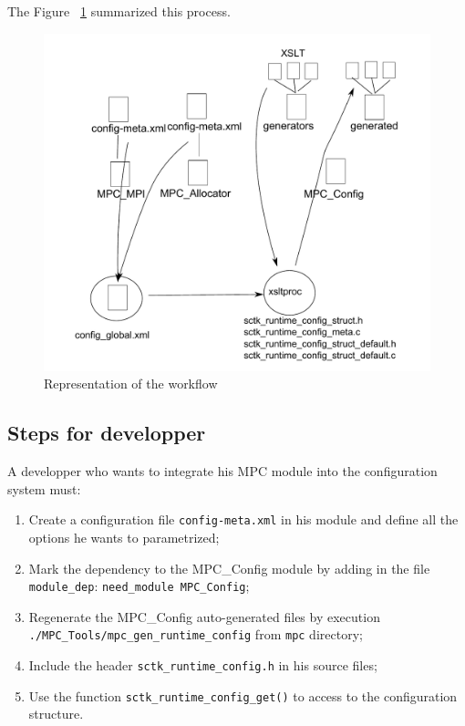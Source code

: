 \documentclass{article}
\begin{document}
\noindent The Figure ~\ref{fig:conf_workflow_conf} summarized this process.

\begin{figure}[htc!]
\includegraphics[scale=0.8]{file-workflow.pdf}
\caption{Representation of the workflow}
\label{fig:conf_workflow_conf}
\end{figure}

\subsection {Steps for developper}

A developper who wants to integrate his MPC module into the configuration system must:
\begin{enumerate}
\item Create a configuration file \texttt{config-meta.xml} in his module and define all the options he wants to parametrized;
\item Mark the dependency to the MPC\_Config module by adding in the file \texttt{module\_dep}: \texttt{need\_module MPC\_Config};
\item Regenerate the MPC\_Config auto-generated files by execution \texttt{./MPC\_Tools/mpc\_gen\_runtime\_config} from \texttt{mpc} directory;
\item Include the header \texttt{sctk\_runtime\_config.h} in his source files;
\item Use the function \texttt{sctk\_runtime\_config\_get()} to access to the configuration structure.
\end{enumerate}
\end{document}
